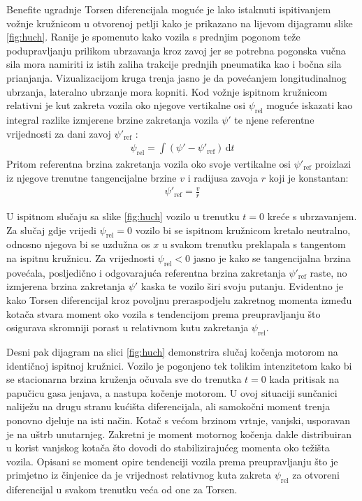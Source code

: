\documentclass[11pt]{article}
\numberwithin{equation}{section}%
\begin{document}
Benefite ugradnje Torsen diferencijala moguće je lako istaknuti ispitivanjem vožnje kružnicom u otvorenoj petlji kako je prikazano na lijevom dijagramu slike \ref{fig:huch}. Ranije je spomenuto kako vozila s prednjim pogonom teže podupravljanju prilikom ubrzavanja kroz zavoj jer se potrebna pogonska vučna sila mora namiriti iz istih zaliha trakcije prednjih pneumatika kao i bočna sila prianjanja. Vizualizacijom kruga trenja jasno je da povećanjem longitudinalnog ubrzanja, lateralno ubrzanje mora kopniti. Kod vožnje ispitnom kružnicom relativni je kut zakreta vozila oko njegove vertikalne osi $\psi_\text{rel}$ moguće iskazati kao integral razlike izmjerene brzine zakretanja vozila $\psi'$ te njene referentne vrijednosti za dani zavoj $\psi'_\text{ref}$ \cite{huchtkotter1996LSD}:
%
\begin{gather}
\psi_\text{rel}=\int (\psi'- \psi'_\text{ref})\,\mathrm{d}t
\label{izrazic}
\end{gather}
%
Pritom referentna brzina zakretanja vozila oko svoje vertikalne osi $\psi'_\text{ref}$ proizlazi iz njegove trenutne tangencijalne brzine $v$ i radijusa zavoja $r$ koji je konstantan:
%
\begin{gather}
\psi'_\text{ref}=\frac{v}{r}
\end{gather}

U ispitnom slučaju sa slike \ref{fig:huch} vozilo u trenutku $t=0$ kreće s ubrzavanjem. Za slučaj gdje vrijedi $\psi_\text{rel}=0$ vozilo bi se ispitnom kružnicom kretalo neutralno, odnosno njegova bi se uzdužna os $x$ u svakom trenutku preklapala s tangentom na ispitnu kružnicu. Za vrijednosti $\psi_\text{rel}<0$ jasno je kako se tangencijalna brzina povećala, posljedično i odgovarajuća referentna brzina zakretanja $\psi'_\text{ref}$ raste, no izmjerena brzina zakretanja $\psi'$ kaska te vozilo širi svoju putanju. Evidentno je kako Torsen diferencijal kroz povoljnu preraspodjelu zakretnog momenta između kotača stvara moment oko vozila s tendencijom prema preupravljanju što osigurava skromniji porast u relativnom kutu zakretanja $\psi_\text{rel}$.

Desni pak dijagram na slici \ref{fig:huch} demonstrira slučaj kočenja motorom na identičnoj ispitnoj kružnici. Vozilo je pogonjeno tek tolikim intenzitetom kako bi se stacionarna brzina kruženja očuvala sve do trenutka $t=0$ kada pritisak na papučicu gasa jenjava, a nastupa kočenje motorom. U ovoj situaciji sunčanici naliježu na drugu stranu kućišta diferencijala, ali samokočni moment trenja ponovno djeluje na isti način. Kotač s većom brzinom vrtnje, vanjski, usporavan je na uštrb unutarnjeg. Zakretni je moment motornog kočenja dakle distribuiran u korist vanjskog kotača što dovodi do stabilizirajućeg momenta oko težišta vozila. Opisani se moment opire tendenciji vozila prema preupravljanju što je primjetno iz činjenice da je vrijednost relativnog kuta zakreta $\psi_\text{rel}$ za otvoreni diferencijal u svakom trenutku veća od one za Torsen.
\end{document}
